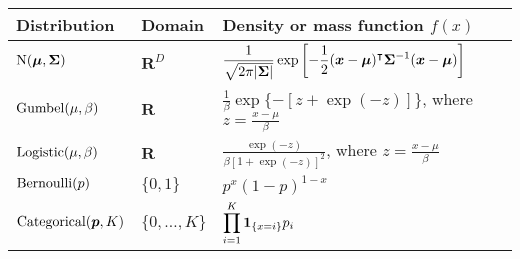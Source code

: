 \begin{tabularx}{\linewidth}{llX}
	Distribution & Domain                                                                                                               & Density or mass function $f(x)$ \\
	\midrule
	$\mathrm{N}( \bm{\mu}, \bm{\Sigma} )$
	             & $\mathbf{R}^D$
	             & $\displaystyle \frac{1}{\sqrt{2 \pi \lvert\bm{\Sigma}\rvert}}
	\exp \left[ -\frac{1}{2} (\bm{x} - \bm{\mu})^\intercal \bm{\Sigma}^{-1} (\bm{x} - \bm{\mu}) \right] $                                                                        \\
	\rule{0pt}{5ex}%
	$\mathrm{Gumbel}( \mu, \beta )$
	             & $\mathbf{R}$
	             & $\displaystyle \frac{1}{\beta} \exp \{ - [z + \exp(-z)]\}$, where $\displaystyle z = \frac{x - \mu}{\beta}$                                            \\
	\rule{0pt}{5ex}%
	$\mathrm{Logistic}( \mu, \beta )$
	             & $\mathbf{R}$
	             & $\displaystyle \frac{\exp(-z)}{\beta \left[1 + \exp(-z) \right]^2}$, where $\displaystyle z = \frac{x - \mu}{\beta}$                                   \\
	\rule{0pt}{5ex}%
	$\mathrm{Bernoulli}( p )$
	             & $\{0, 1\}$
	             & $\displaystyle p^x (1-p)^{1-x}$                                                                                                                        \\
	\rule{0pt}{5ex}%
	$\mathrm{Categorical}( \bm{p}, K )$
	             & $\{0, \ldots, K\}$
	             & $\displaystyle \prod_{i=1}^K \bm{1}_{\left \{ x=i \right \} } p_i$                                                                                                          \\
\end{tabularx}

\endgroup
